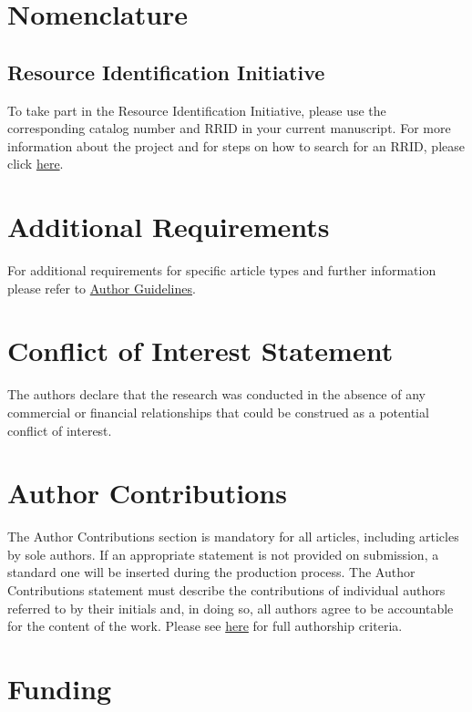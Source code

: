 \documentclass[utf8]{frontiersSCNS} %
\begin{document}
\section{Nomenclature}

\subsection{Resource Identification Initiative}

To take part in the Resource Identification Initiative, please use the
corresponding catalog number and RRID in your current manuscript. For
more information about the project and for steps on how to search for
an RRID, please click
\href{http://www.frontiersin.org/files/pdf/letter_to_author.pdf}{here}.

\section{Additional Requirements}

For additional requirements for specific article types and further
information please refer to
\href{http://www.frontiersin.org/about/AuthorGuidelines#AdditionalRequirements}{Author
  Guidelines}.

\section*{Conflict of Interest Statement}

The authors declare that the research was conducted in the absence of
any commercial or financial relationships that could be construed as a
potential conflict of interest.

\section*{Author Contributions}

The Author Contributions section is mandatory for all articles,
including articles by sole authors. If an appropriate statement is not
provided on submission, a standard one will be inserted during the
production process. The Author Contributions statement must describe
the contributions of individual authors referred to by their initials
and, in doing so, all authors agree to be accountable for the content
of the work. Please see
\href{http://home.frontiersin.org/about/author-guidelines#AuthorandContributors}{here}
for full authorship criteria.

\section*{Funding}
\end{document}

